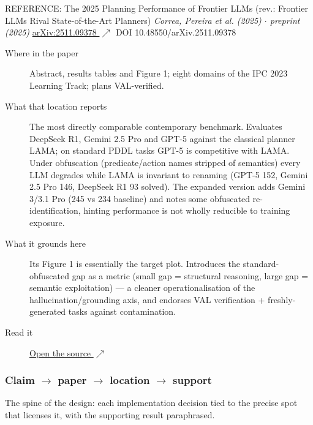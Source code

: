 \begin{bmmcard}{REFERENCE: The 2025 Planning Performance of Frontier LLMs (rev.: Frontier LLMs Rival State-of-the-Art Planners)}
\emph{Correa, Pereira et al. (2025) \(\cdot\) preprint (2025)}
\href{https://arxiv.org/abs/2511.09378}{arXiv:2511.09378 \(\nearrow\)} DOI 10.48550/arXiv.2511.09378
\begin{description}
\item[Where in the paper] Abstract, results tables and Figure 1; eight domains of the IPC 2023 Learning Track; plans VAL-verified.
\item[What that location reports] The most directly comparable contemporary benchmark. Evaluates DeepSeek R1, Gemini 2.5 Pro and GPT-5 against the classical planner LAMA; on standard PDDL tasks GPT-5 is competitive with LAMA. Under obfuscation (predicate/action names stripped of semantics) every LLM degrades while LAMA is invariant to renaming (GPT-5 152, Gemini 2.5 Pro 146, DeepSeek R1 93 solved). The expanded version adds Gemini 3/3.1 Pro (245 vs 234 baseline) and notes some obfuscated re-identification, hinting performance is not wholly reducible to training exposure.
\item[What it grounds here] Its Figure 1 is essentially the target plot. Introduces the standard-obfuscated gap as a metric (small gap = structural reasoning, large gap = semantic exploitation) --- a cleaner operationalisation of the hallucination/grounding axis, and endorses VAL verification + freshly-generated tasks against contamination.
\item[Read it] \href{https://arxiv.org/abs/2511.09378}{Open the source \(\nearrow\)}
\end{description}
\end{bmmcard}

\subsubsection{Claim \(\rightarrow\) paper \(\rightarrow\) location \(\rightarrow\) support}

The spine of the design: each implementation decision tied to the precise spot that licenses it, with the supporting result paraphrased.

